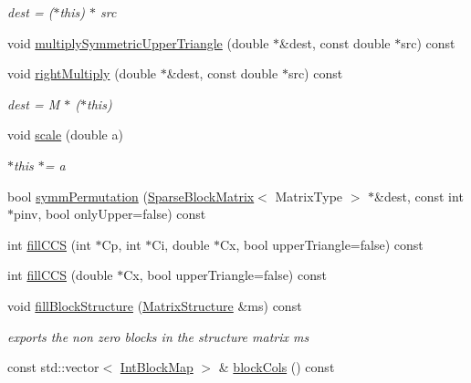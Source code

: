 \begin{DoxyCompactItemize}
\begin{DoxyCompactList}\small\item\em dest = ($\ast$this) $\ast$ src \end{DoxyCompactList}\item 
void \mbox{\hyperlink{classg2o_1_1_sparse_block_matrix_a87a57d96e63668c7131dee642c25ac5f}{multiply\+Symmetric\+Upper\+Triangle}} (double $\ast$\&dest, const double $\ast$src) const
\item 
void \mbox{\hyperlink{classg2o_1_1_sparse_block_matrix_a7efaf2e4ea855f6faf500f9feacf3d3e}{right\+Multiply}} (double $\ast$\&dest, const double $\ast$src) const
\begin{DoxyCompactList}\small\item\em dest = M $\ast$ ($\ast$this) \end{DoxyCompactList}\item 
void \mbox{\hyperlink{classg2o_1_1_sparse_block_matrix_afbccb3c0404beeba566e21429089e288}{scale}} (double a)
\begin{DoxyCompactList}\small\item\em $\ast$this $\ast$= a \end{DoxyCompactList}\item 
bool \mbox{\hyperlink{classg2o_1_1_sparse_block_matrix_a0dcf826fe329e922eae1ea92c73c7b23}{symm\+Permutation}} (\mbox{\hyperlink{classg2o_1_1_sparse_block_matrix}{Sparse\+Block\+Matrix}}$<$ Matrix\+Type $>$ $\ast$\&dest, const int $\ast$pinv, bool only\+Upper=false) const
\item 
int \mbox{\hyperlink{classg2o_1_1_sparse_block_matrix_a54b93e3ed8ccb6c30e694d417f7c336f}{fill\+C\+CS}} (int $\ast$Cp, int $\ast$Ci, double $\ast$Cx, bool upper\+Triangle=false) const
\item 
int \mbox{\hyperlink{classg2o_1_1_sparse_block_matrix_ac01f380ada64511737cb97631d39a9e8}{fill\+C\+CS}} (double $\ast$Cx, bool upper\+Triangle=false) const
\item 
void \mbox{\hyperlink{classg2o_1_1_sparse_block_matrix_add5e7a5c95f2a6be69ededec4a043a94}{fill\+Block\+Structure}} (\mbox{\hyperlink{classg2o_1_1_matrix_structure}{Matrix\+Structure}} \&ms) const
\begin{DoxyCompactList}\small\item\em exports the non zero blocks in the structure matrix ms \end{DoxyCompactList}\item 
const std\+::vector$<$ \mbox{\hyperlink{classg2o_1_1_sparse_block_matrix_aaa6ca1ae454ed70f62992b6401645f4e}{Int\+Block\+Map}} $>$ \& \mbox{\hyperlink{classg2o_1_1_sparse_block_matrix_ab818f8923b845d08a38e8de1145fbb65}{block\+Cols}} () const

\end{DoxyCompactItemize}

